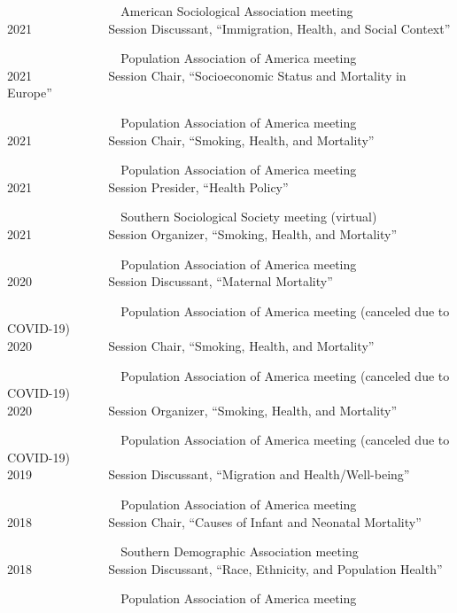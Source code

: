 \documentclass[11pt,]{article}
\begin{document}
\strut ~ ~ ~ ~ ~ ~ ~ ~ ~ ~ ~ American Sociological Association meeting\\
2021 ~ ~ ~ ~ ~ ~ ~ Session Discussant, ``Immigration, Health, and Social
Context''\\
\strut ~ ~ ~ ~ ~ ~ ~ ~ ~ ~ ~ Population Association of America meeting\\
2021 ~ ~ ~ ~ ~ ~ ~ Session Chair, ``Socioeconomic Status and Mortality
in Europe''\\
\strut ~ ~ ~ ~ ~ ~ ~ ~ ~ ~ ~ Population Association of America meeting\\
2021 ~ ~ ~ ~ ~ ~ ~ Session Chair, ``Smoking, Health, and Mortality''\\
\strut ~ ~ ~ ~ ~ ~ ~ ~ ~ ~ ~ Population Association of America meeting\\
2021 ~ ~ ~ ~ ~ ~ ~ Session Presider, ``Health Policy''\\
\strut ~ ~ ~ ~ ~ ~ ~ ~ ~ ~ ~ Southern Sociological Society meeting
(virtual)\\
2021 ~ ~ ~ ~ ~ ~ ~ Session Organizer, ``Smoking, Health, and
Mortality''\\
\strut ~ ~ ~ ~ ~ ~ ~ ~ ~ ~ ~ Population Association of America meeting\\
2020 ~ ~ ~ ~ ~ ~ ~ Session Discussant, ``Maternal Mortality''\\
\strut ~ ~ ~ ~ ~ ~ ~ ~ ~ ~ ~ Population Association of America meeting
(canceled due to COVID-19)\\
2020 ~ ~ ~ ~ ~ ~ ~ Session Chair, ``Smoking, Health, and Mortality''\\
\strut ~ ~ ~ ~ ~ ~ ~ ~ ~ ~ ~ Population Association of America meeting
(canceled due to COVID-19)\\
2020 ~ ~ ~ ~ ~ ~ ~ Session Organizer, ``Smoking, Health, and
Mortality''\\
\strut ~ ~ ~ ~ ~ ~ ~ ~ ~ ~ ~ Population Association of America meeting
(canceled due to COVID-19)\\
2019 ~ ~ ~ ~ ~ ~ ~ Session Discussant, ``Migration and
Health/Well-being''\\
\strut ~ ~ ~ ~ ~ ~ ~ ~ ~ ~ ~ Population Association of America meeting\\
2018 ~ ~ ~ ~ ~ ~ ~ Session Chair, ``Causes of Infant and Neonatal
Mortality''\\
\strut ~ ~ ~ ~ ~ ~ ~ ~ ~ ~ ~ Southern Demographic Association meeting\\
2018 ~ ~ ~ ~ ~ ~ ~ Session Discussant, ``Race, Ethnicity, and Population
Health''\\
\strut ~ ~ ~ ~ ~ ~ ~ ~ ~ ~ ~ Population Association of America meeting\\
\end{document}
